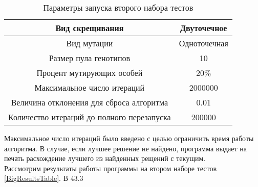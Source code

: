 \begin{table}[ht]
\centering
\caption{Параметры запуска второго набора тестов}
\label{ParamTable}
\begin{tabular}{|c|c|}
\hline
Вид скрещивания                            & Двуточечное  \\ \hline
Вид мутации                                & Одноточечная \\ \hline
Размер пула генотипов                      & 10           \\ \hline
Процент мутирующих особей                  & 20\%         \\ \hline
Максимальное число итераций                & 2000000      \\ \hline
Величина отклонения для сброса алгоритма   & 0.01         \\ \hline
Количество итераций до полного перезапуска & 200000       \\ \hline
\end{tabular}
\end{table}
Максимальное число итераций было введено с целью ограничить время работы алгоритма. В случае, если лучшее решение не найдено, программа выдает на печать расхождение лучшего из найденных рещений с текущим.\\
Рассмотрим результаты работы программы на втором наборе тестов \ref{BigResultsTable}. В 43.3%

